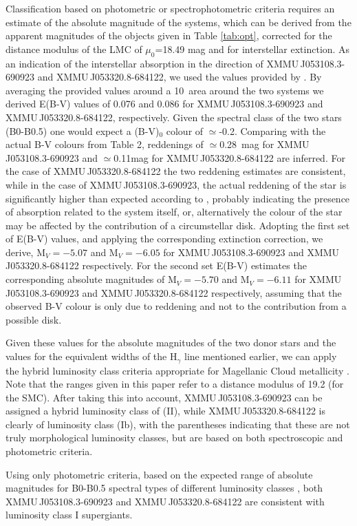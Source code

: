 \documentclass[a4paper,fleqn,usenatbib]{mnras}
\newcommand{\canda}{XMMU\,J053108.3-690923\xspace} %
\newcommand{\candb}{XMMU\,J053320.8-684122\xspace} %
\begin{document}
Classification based on photometric or spectrophotometric criteria requires an estimate of the absolute magnitude of the systems, which can be derived from the apparent magnitudes of the objects given in Table \ref{tab:opt}, corrected for the distance modulus of the LMC of $\mu_0$=18.49 mag
\citep{2013Natur.495...76P} and for interstellar extinction. As an indication of the interstellar absorption in the direction of \canda and \candb, we used the values provided by \citet{2011AJ....141..158H}. By averaging the provided values around a 10\arcmin~area around the two systems we derived E(B-V) values of 0.076 and 0.086 for \canda and \candb ,  respectively. Given the spectral class of the two stars (B0-B0.5) one would expect a (B-V)$_0$ colour of $\simeq$-0.2. Comparing with the actual B-V colours from Table 2, reddenings of $\simeq$0.28~mag for \canda and $\simeq$0.11mag for \candb are inferred. For the case of \candb the two reddening estimates are consistent, while in the case of \canda, the actual reddening of the star is significantly higher than expected according to \citet{2011AJ....141..158H}, probably indicating the presence of absorption related to the system itself, or, alternatively the colour of the star may be affected by the contribution of a circumstellar disk. Adopting the first set of E(B-V) values, and applying the corresponding extinction correction, we derive, M$_V= -5.07$ and   M$_V= -6.05$ for \canda and \candb respectively.
For the second set E(B-V) estimates the corresponding absolute magnitudes of M$_V= -5.70$ and   M$_V= -6.11$ for \canda and \candb respectively, assuming that the observed B-V colour is only due to reddening and not to the contribution from a possible disk. 

Given these values for the absolute magnitudes of the two donor stars and the values for the equivalent widths of the H$_{\gamma}$ line mentioned earlier, we can apply the hybrid luminosity class criteria appropriate for Magellanic Cloud metallicity \citep[see Table 3 of][]{2004MNRAS.353..601E}. Note that the ranges given in this paper refer to a distance modulus of 19.2 (for the SMC). After taking this into account, \canda can be assigned a hybrid luminosity class of (II), while \candb is clearly of luminosity class (Ib), with the parentheses indicating that these are not truly morphological luminosity classes, but are based on both spectroscopic and photometric criteria.  

Using only photometric criteria, based on the expected range of absolute magnitudes for B0-B0.5 spectral types of different luminosity classes \citep[e.g.][]{2006MNRAS.371..185W,2017AJ....154..102U}, both \canda and \candb are consistent with luminosity class I supergiants. 
 
\end{document}
